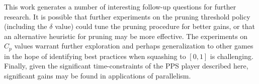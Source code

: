 \documentclass[letterpaper]{article}
\begin{document}
This work generates a number of interesting follow-up questions for further research. It is possible that further experiments on the pruning threshold policy (including the $\delta$ value) could tune the pruning procedure for better gains, or that an alternative heuristic for pruning may be more effective. The experiments on $C_p$ values warrant further exploration and perhaps generalization to other games in the hope of identifying best practices when squashing to $[0,1]$ is challenging. Finally, given the significant time-constraints of the PPS player described here, significant gains may be found in applications of parallelism.




%
%
%
%
%
\end{document}
